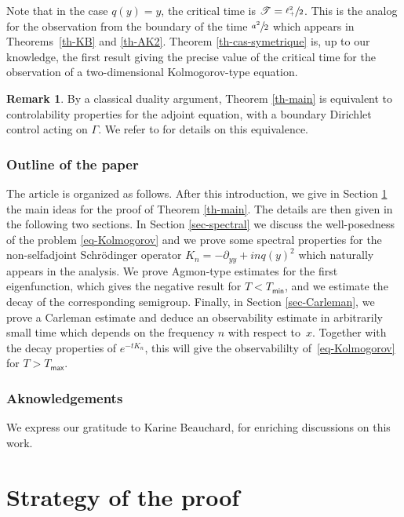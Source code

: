 \documentclass[JEP,XML,SOM,Unicode]{cedram}
\let\mathcal\mathscr
\theoremstyle{plain}
\theoremstyle{definition}
\newtheorem{remark}[theorem]{Remark}
\newcommand{\1}{\mathds 1}
\newcommand{\Tc}{{\mathcal T}}
\newcommand{\Tmin}{T_{\mathsf{min}}}
\newcommand{\Tmax}{T_{\mathsf{max}}}
\begin{document}
Note that in the case $q(y) = y$, the critical time is $\Tc = \sfrac{\ell_+^2}{2}$. This is the analog for the observation from the boundary of the time $\sfrac {a^2}2$ which appears in Theorems~\ref{th-KB} and \ref{th-AK2}. Theorem \ref{th-cas-symetrique} is,
up to our knowledge, the first result giving the precise value of the critical time for the observation
of a two-dimensional Kolmogorov-type equation.

\begin{remark}
By a classical duality argument, Theorem \ref{th-main} is equivalent to controlability properties for the adjoint equation, with a boundary Dirichlet control acting on $\Gamma$. We refer to \cite{tucsnak} for details on this equivalence.
\end{remark}

\subsubsection*{Outline of the paper} The article is organized as follows. After this introduction, we give in Section \ref{sec-strategy} the main ideas for the proof of Theorem \ref{th-main}. The details are then given in the following two sections. In Section \ref{sec-spectral} we discuss the well-posedness of the problem \eqref{eq-Kolmogorov} and we prove some spectral properties for the non-selfadjoint Schrödinger operator $K_n = -\partial_{yy} + inq(y)^2$ which naturally appears in the analysis. We prove Agmon-type estimates for the first eigenfunction, which gives the negative result for $T < \Tmin$, and we estimate the decay of the corresponding semigroup. Finally, in Section \ref{sec-Carleman}, we prove a Carleman estimate and deduce an observability estimate in arbitrarily small time which depends on the frequency $n$ with respect to~$x$. Together with the decay properties of $e^{-tK_n}$, this will give the observabililty of~\eqref{eq-Kolmogorov} for $T > \Tmax$.

\subsubsection*{Aknowledgements} We express our gratitude to Karine Beauchard, for enriching discussions on this work.


\section{Strategy of the proof} \label{sec-strategy}
\end{document}
